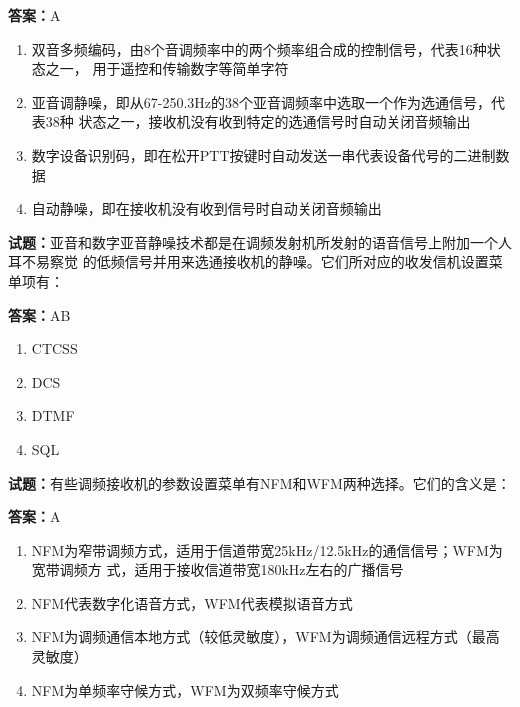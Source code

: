 \documentclass{ctexbook}
\begin{document}
\textbf{答案：}A 

\begin{enumerate}[leftmargin=3em]
  \item 双音多频编码，由8个音调频率中的两个频率组合成的控制信号，代表16种状态之一，
用于遥控和传输数字等简单字符 

  \item 亚音调静噪，即从67-250.3Hz的38个亚音调频率中选取一个作为选通信号，代表38种
状态之一，接收机没有收到特定的选通信号时自动关闭音频输出 

  \item 数字设备识别码，即在松开PTT按键时自动发送一串代表设备代号的二进制数据 

  \item 自动静噪，即在接收机没有收到信号时自动关闭音频输出 

\end{enumerate}





\vspace{1em}

\textbf{试题：}亚音和数字亚音静噪技术都是在调频发射机所发射的语音信号上附加一个人耳不易察觉
的低频信号并用来选通接收机的静噪。它们所对应的收发信机设置菜单项有： 

\textbf{答案：}AB 

\begin{enumerate}[leftmargin=3em]
  \item CTCSS 

  \item DCS 

  \item DTMF 

  \item SQL 

\end{enumerate}





\vspace{1em}

\textbf{试题：}有些调频接收机的参数设置菜单有NFM和WFM两种选择。它们的含义是： 

\textbf{答案：}A 

\begin{enumerate}[leftmargin=3em]
  \item NFM为窄带调频方式，适用于信道带宽25kHz/12.5kHz的通信信号；WFM为宽带调频方
式，适用于接收信道带宽180kHz左右的广播信号 

  \item NFM代表数字化语音方式，WFM代表模拟语音方式 

  \item NFM为调频通信本地方式（较低灵敏度），WFM为调频通信远程方式（最高灵敏度） 

  \item NFM为单频率守候方式，WFM为双频率守候方式 

\end{enumerate}
\end{document}
